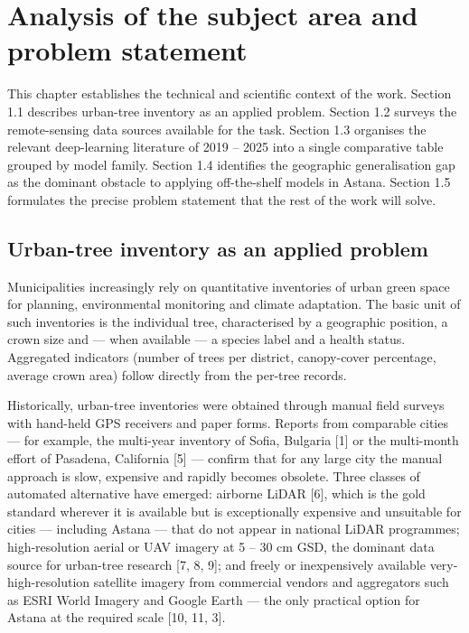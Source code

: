 \chapter{Analysis of the subject area and problem statement}\label{chapter-1.-analysis-of-the-subject-area-and-problem-statement}

This chapter establishes the technical and scientific context of the work. Section 1.1 describes urban-tree inventory as an applied problem. Section 1.2 surveys the remote-sensing data sources available for the task. Section 1.3 organises the relevant deep-learning literature of 2019 -- 2025 into a single comparative table grouped by model family. Section 1.4 identifies the geographic generalisation gap as the dominant obstacle to applying off-the-shelf models in Astana. Section 1.5 formulates the precise problem statement that the rest of the work will solve.

\section{Urban-tree inventory as an applied problem}\label{urban-tree-inventory-as-an-applied-problem}

Municipalities increasingly rely on quantitative inventories of urban green space for planning, environmental monitoring and climate adaptation. The basic unit of such inventories is the individual tree, characterised by a geographic position, a crown size and --- when available --- a species label and a health status. Aggregated indicators (number of trees per district, canopy-cover percentage, average crown area) follow directly from the per-tree records.

Historically, urban-tree inventories were obtained through manual field surveys with hand-held GPS receivers and paper forms. Reports from comparable cities --- for example, the multi-year inventory of Sofia, Bulgaria {[}1{]} or the multi-month effort of Pasadena, California {[}5{]} --- confirm that for any large city the manual approach is slow, expensive and rapidly becomes obsolete. Three classes of automated alternative have emerged: airborne LiDAR {[}6{]}, which is the gold standard wherever it is available but is exceptionally expensive and unsuitable for cities --- including Astana --- that do not appear in national LiDAR programmes; high-resolution aerial or UAV imagery at 5 -- 30 cm GSD, the dominant data source for urban-tree research {[}7, 8, 9{]}; and freely or inexpensively available very-high-resolution satellite imagery from commercial vendors and aggregators such as ESRI World Imagery and Google Earth --- the only practical option for Astana at the required scale {[}10, 11, 3{]}.

